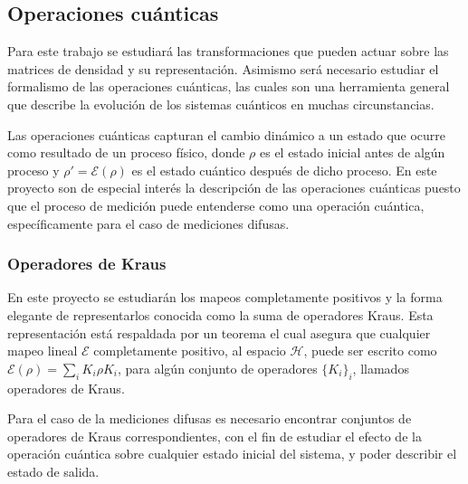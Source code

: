 \subsection{Operaciones cuánticas}

Para este trabajo se estudiará las transformaciones que pueden actuar sobre las matrices de densidad y su representación. Asimismo será necesario estudiar el formalismo de las operaciones cuánticas, las cuales son una herramienta general que describe la evolución de los sistemas cuánticos en muchas circunstancias. 


Las operaciones cuánticas capturan el cambio dinámico a un estado que ocurre como resultado de un proceso físico, donde $\rho$ es el estado inicial antes de algún proceso y $\rho '=\mathcal{E}(\rho) $ es el estado cuántico después de dicho proceso. En este proyecto son de especial interés la descripción de las operaciones cuánticas puesto que el proceso de medición puede entenderse como una operación cuántica, específicamente para el caso de mediciones difusas. 





\subsubsection{Operadores de Kraus}

En este proyecto se estudiarán los mapeos completamente positivos y la forma elegante de representarlos conocida como la suma de operadores Kraus. Esta representación está respaldada por un teorema el cual asegura que cualquier mapeo lineal $\mathcal{E}$   completamente positivo, al espacio $\mathcal{H}$, puede ser escrito como $\mathcal{E}(\rho)=\sum_iK_i\rho K_i$, para algún conjunto de operadores $\{K_i\}_i$, llamados operadores de Kraus.

Para el caso de la mediciones difusas es necesario encontrar conjuntos de operadores de Kraus correspondientes, con el fin de estudiar el efecto de la operación cuántica sobre cualquier estado inicial del sistema, y poder describir el estado de salida.









